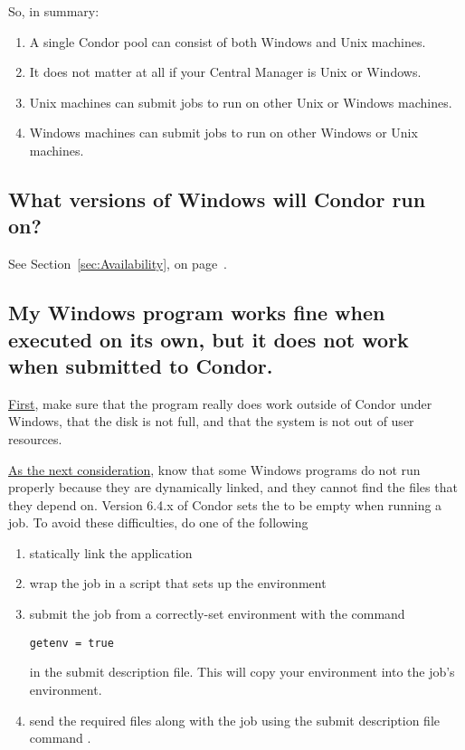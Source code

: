 So, in summary:

\begin{enumerate}

\item{A single Condor pool can consist of both Windows and Unix
machines.}

\item{It does not matter at all if your Central Manager is Unix or Windows.}

\item{Unix machines can submit jobs to run on other Unix or Windows
machines.}

\item{Windows machines can submit jobs to run on other Windows
or Unix machines.}

\end{enumerate}


\subsection*{What versions of Windows will Condor run on?}

See Section~\ref{sec:Availability}, on
page~\pageref{sec:Availability}.


\subsection*{My Windows program works fine when executed on its own, but it
does not work when submitted to Condor.}

\underline{First}, make sure that the program really does work
outside of Condor under Windows,
that the disk is not full,
and that the system is not out of user resources.

\underline{As the next consideration},
know that 
some Windows programs do not run properly because they are dynamically linked,
and they cannot find the  files that they depend on.
Version 6.4.x of Condor sets the  to be empty when
running a job.
To avoid these difficulties, do one of the following
\begin{enumerate}
\item statically link the application
\item wrap the job in a script that sets up the environment
\item submit the job from a correctly-set environment with the command
\begin{verbatim}
getenv = true
\end{verbatim}
in the submit description file.
This will copy your environment into the job's environment.
\item send the required  files along with the job
using the submit description file command .
\end{enumerate}


